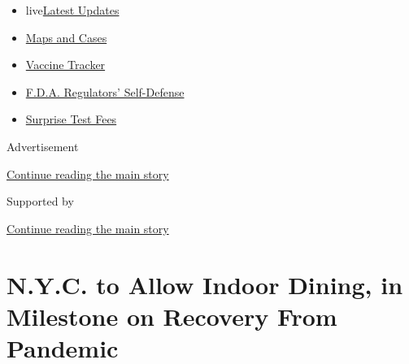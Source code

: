 \begin{itemize}
\tightlist
\item
  live\href{https://www.nytimes3xbfgragh.onion/2020/09/12/world/covid-19-coronavirus.html?name=styln-coronavirus-national\&region=TOP_BANNER\&block=storyline_menu_recirc\&action=click\&pgtype=Article\&impression_id=faa237d1-f52d-11ea-8b73-3bde8420cfaf\&variant=undefined}{Latest
  Updates}
\item
  \href{https://www.nytimes3xbfgragh.onion/interactive/2020/us/coronavirus-us-cases.html?name=styln-coronavirus-national\&region=TOP_BANNER\&block=storyline_menu_recirc\&action=click\&pgtype=Article\&impression_id=faa237d2-f52d-11ea-8b73-3bde8420cfaf\&variant=undefined}{Maps
  and Cases}
\item
  \href{https://www.nytimes3xbfgragh.onion/interactive/2020/science/coronavirus-vaccine-tracker.html?name=styln-coronavirus-national\&region=TOP_BANNER\&block=storyline_menu_recirc\&action=click\&pgtype=Article\&impression_id=faa237d3-f52d-11ea-8b73-3bde8420cfaf\&variant=undefined}{Vaccine
  Tracker}
\item
  \href{https://www.nytimes3xbfgragh.onion/2020/09/10/us/politics/fda-coronavirus-vaccine.html?name=styln-coronavirus-national\&region=TOP_BANNER\&block=storyline_menu_recirc\&action=click\&pgtype=Article\&impression_id=faa25ee0-f52d-11ea-8b73-3bde8420cfaf\&variant=undefined}{F.D.A.
  Regulators' Self-Defense}
\item
  \href{https://www.nytimes3xbfgragh.onion/2020/09/09/upshot/coronavirus-surprise-test-fees.html?name=styln-coronavirus-national\&region=TOP_BANNER\&block=storyline_menu_recirc\&action=click\&pgtype=Article\&impression_id=faa25ee1-f52d-11ea-8b73-3bde8420cfaf\&variant=undefined}{Surprise
  Test Fees}
\end{itemize}

Advertisement

\protect\hyperlink{after-top}{Continue reading the main story}

Supported by

\protect\hyperlink{after-sponsor}{Continue reading the main story}

\hypertarget{nyc-to-allow-indoor-dining-in-milestone-on-recovery-from-pandemic}{%
\section{N.Y.C. to Allow Indoor Dining, in Milestone on Recovery From
Pandemic}\label{nyc-to-allow-indoor-dining-in-milestone-on-recovery-from-pandemic}}

